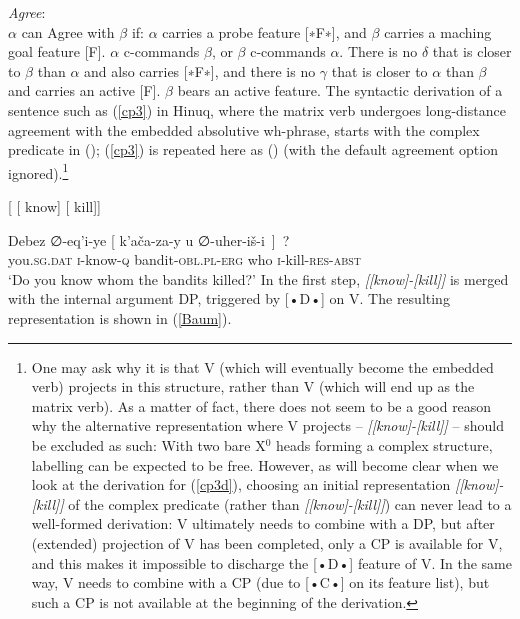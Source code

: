 \documentclass[output=paper
,modfonts
,nonflat]{langsci/langscibook}
\begin{document}
	\ea\label{ex:mueller:29} {\itshape Agree}:\\
	$\alpha$ can Agree with $\beta$ if:
	\ea $\alpha$ carries a probe feature [∗F∗], and $\beta$ carries a
	maching goal feature [F].
	\ex $\alpha$ \label{agua2}c-commands $\beta$, or $\beta$ c-commands $\alpha$.
	\ex There is \label{agua3}no $\delta$ that is closer to $\beta$ than $\alpha$ and
	also carries [∗F∗], and there is no $\gamma$ that is closer to
	$\alpha$ than $\beta$ and carries an active [F].
	\ex $\beta$ bears an \label{agua4}active feature. 
	\z
	\z
	The syntactic derivation of a sentence such as (\ref{cp3}) in Hinuq,
	where the matrix verb undergoes long-distance agreement with the
	embedded absolutive wh-phrase, starts with the complex predicate in
	(\Next); (\ref{cp3}) is repeated here as (\NNext) (with the default
	agreement option ignored).\footnote{\label{vari2}One may ask why it is
		that V (which will eventually become the embedded verb) projects
		in this structure, rather than V (which will end up as the matrix
		verb).  As a matter of fact, there does not seem to be a good reason
		why the alternative representation where V projects -- {\it
			[\sub{V\sub{1}}[know]-[kill]]} -- should be excluded as such:
		With two bare X$^0$ heads forming a complex structure, labelling can
		be expected to be free. However, as will become clear when we look
		at the derivation for (\ref{cp3d}), choosing an initial representation
		{\itshape [[know]-[kill]]} of the complex predicate
		(rather than {\itshape [[know]-[kill]]}) can never lead
		to a well-formed derivation: V ultimately needs to combine with a
		DP, but after (extended) projection of V has been completed, only
		a CP is available for V, and this makes it impossible to discharge
		the [•D•] feature of V. In the
		same way, V needs to combine with a CP (due to [•C•] on its feature list), but such a
		CP is not available at the beginning of the derivation.}
	
	\ea\relax\label{ex:mueller:30} {[} [ know] [ kill]]\z
	
	\ea\label{ex:mueller:31}  \label{cp3d}
	\gll  Debez ∅-eq'i-ye [ k'a\v{c}a\textgamma -za-y \textbeltl u ∅-uher-i\v{s}-\textbeltl i~]~? \\
	you.{\scshape sg.dat} {\scshape i}-know-{\scshape q} {} bandit-{\scshape obl.pl-erg}   who {\scshape i}-kill-{\scshape res-abst} \\ 
	\glt `Do you know whom the bandits killed?'
	\z
	In the first step, {\itshape [[know]-[kill]]} is merged
	with  the internal argument DP, triggered by  [•D•] on V. The resulting
	representation is shown in (\ref{Baum}).
\end{document}
